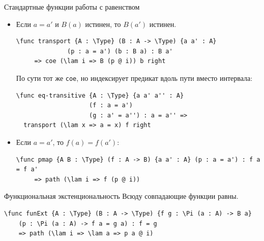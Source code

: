 \documentclass[aspectratio=169]{beamer}
\begin{document}
\begin{frame}[fragile]{Стандартные функции работы с равенством}
\begin{itemize}
\item Если $a = a'$ и $B(a)$ истинен, то $B(a')$ истинен.

\small\color[HTML]{025002}\begin{verbatim}\func transport {A : \Type} (B : A -> \Type) {a a' : A} 
              (p : a = a') (b : B a) : B a'
     => coe (\lam i => B (p @ i)) b right\end{verbatim}
\normalsize\color{black}

По сути тот же \verb!coe!, но индексирует предикат вдоль пути вместо интервала:

\small\color[HTML]{025002}\begin{verbatim}\func eq-transitive {A : \Type} {a a' a'' : A}
                    (f : a = a')
                    (g : a' = a'') : a = a'' =>
  transport (\lam x => a = x) f right
\end{verbatim}\normalsize
\color{black}

\item Если $a = a'$, то $f(a) = f(a')$:

\small\color[HTML]{025002}\begin{verbatim}
\func pmap {A B : \Type} (f : A -> B) {a a' : A} (p : a = a') : f a = f a' 
     => path (\lam i => f (p @ i))
\end{verbatim}\normalsize
\color{black}
\end{itemize}

\end{frame}

\begin{frame}[fragile]{Функциональная экстенциональность}
Всюду совпадающие функции равны.

\small\color[HTML]{025002}\begin{verbatim}\func funExt {A : \Type} (B : A -> \Type) {f g : \Pi (a : A) -> B a}
    (p : \Pi (a : A) -> f a = g a) : f = g
    => path (\lam i => \lam a => p a @ i)\end{verbatim}
\normalsize
\color{black}
\end{frame}
\end{document}
